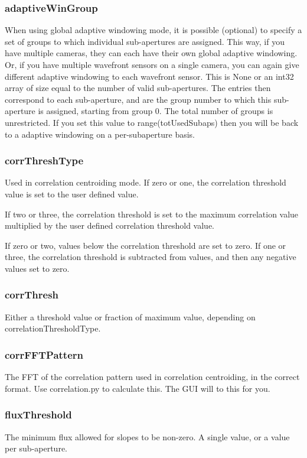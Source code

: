 \documentclass[a4,10pt]{article}
\begin{document}
\subsubsection{adaptiveWinGroup}
When using global adaptive windowing mode, it is possible (optional)
to specify a set of groups to which individual sub-apertures are
assigned.  This way, if you have multiple cameras, they can each have
their own global adaptive windowing.  Or, if you have multiple
wavefront sensors on a single camera, you can again give different
adaptive windowing to each wavefront sensor.  This is None or an int32
array of size equal to the number of valid sub-apertures.  The entries
then correspond to each sub-aperture, and are the group number to
which this sub-aperture is assigned, starting from group 0.  The total
number of groups is unrestricted.  If you set this value to
range(totUsedSubaps) then you will be back to a adaptive windowing on a
per-subaperture basis.

\subsubsection{corrThreshType}
Used in correlation centroiding mode.
If zero or one, the correlation threshold value is set to
the user defined value.

If two or three, the correlation threshold is set to the maximum
correlation value multiplied by the user defined correlation threshold
value.

If zero or two, values below the correlation threshold are set to
zero.  If one or three, the correlation threshold is subtracted from
values, and then any negative values set to zero.

\subsubsection{corrThresh}
Either a threshold value or fraction of maximum value, depending on
correlationThresholdType.

\subsubsection{corrFFTPattern}
The FFT of the correlation pattern used in correlation centroiding, in
the correct format.  Use correlation.py to calculate this.  The GUI
will to this for you.

\subsubsection{fluxThreshold}
The minimum flux allowed for slopes to be non-zero.  A single value,
or a value per sub-aperture.
\end{document}
